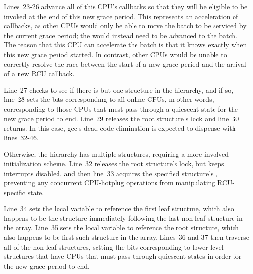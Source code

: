 Lines~23-26 advance all of this CPU's callbacks so that they will
be eligible to be invoked at the end of this new grace period.
This represents an acceleration of callbacks, as other CPUs would only
be able to move the  batch to be serviced
by the current grace period; the  would instead
need to be advanced to the  batch.
The reason that this CPU can accelerate the  batch
is that it knows exactly when this new grace period started.
In contrast, other CPUs would be unable to correctly resolve the
race between the start of a new grace period and the arrival of
a new RCU callback.

Line~27 checks to see if there is but one  structure in
the hierarchy, and if so, line~28 sets the 
bits corresponding to all online CPUs, in other words, corresponding
to those CPUs that must pass through a quiescent state for the new
grace period to end.
Line~29 releases the root  structure's lock and line~30
returns.
In this case, gcc's dead-code elimination is expected to dispense with
lines~32-46.

Otherwise, the  hierarchy has multiple structures, requiring
a more involved initialization scheme.
Line~32 releases the root  structure's lock, but keeps
interrupts disabled, and then line~33 acquires the specified
 structure's , preventing any
concurrent CPU-hotplug operations from manipulating RCU-specific state.

Line~34 sets the  local variable to reference the first
leaf  structure, which also happens to be the
 structure immediately following the last non-leaf
 structure in the  array.
Line~35 sets the  local variable to reference the root
 structure, which also happens to be first such structure
in the  array.
Lines~36 and 37 then traverse all of the non-leaf  structures,
setting the bits corresponding to lower-level  structures
that have CPUs that must pass through quiescent states in order for
the new grace period to end.

